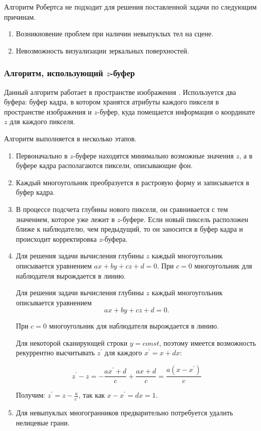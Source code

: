 Алгоритм Робертса не подходит для решения поставленной задачи по следующим причинам.

\begin{enumerate}[label=\arabic*)]
	\item Возникновение проблем при наличии невыпуклых тел на сцене.
	\item Невозможность визуализации зеркальных поверхностей.
\end{enumerate}

\subsubsection{Алгоритм, использующий $z$-буфер}

Данный алгоритм работает в пространстве изображения \cite{rodgers}. Используется два буфера:
	буфер кадра, в котором хранятся атрибуты каждого пикселя в пространстве изображения и $z$-буфер, куда помещается информация о координате $z$ для каждого пикселя.

Алгоритм выполняется в несколько этапов.

\begin{enumerate}[label=\arabic*)]
	\item  Первоначально в $z$-буфере находятся минимально возможные значения $z$, а в буфере кадра располагаются пиксели, описывающие фон. 
	\item Каждый многоугольник преобразуется в растровую форму и записывается в буфер кадра.
	\item В процессе подсчета глубины нового пикселя, он сравнивается с тем значением, которое уже лежит в $z$-буфере. Если новый пиксель расположен ближе к наблюдателю, чем предыдущий, то он заносится в буфер кадра и происходит корректировка $z$-буфера.
	\item  Для решения задачи вычисления глубины $z$ каждый многоугольник описывается уравнением $ax + by + cz + d = 0$. При $c = 0$ многоугольник для наблюдателя вырождается в линию. 
	
	Для решения задачи вычисления глубины $z$ каждый многоугольник описывается уравнением 
	\begin{equation}
			ax + by + cz + d = 0.
	\end{equation}

	При $c = 0$ многоугольник для наблюдателя вырождается в линию. 
	
	Для некоторой сканирующей строки $y = const$, поэтому имеется возможность рекуррентно высчитывать $z^\prime$ для каждого $x^\prime = x + dx$:
	
	\begin{equation}
		z^\prime - z = -\frac{ax^\prime + d}{c} +\frac{ax + d}{c} = \frac{a(x - x^\prime)}{c}
	\end{equation}

Получим: $z^\prime = z - \frac{a}{c^\prime}$, так как $x - x^\prime = dx = 1$.

	\item Для невыпуклых многогранников предварительно потребуется удалить нелицевые грани.
\end{enumerate}

